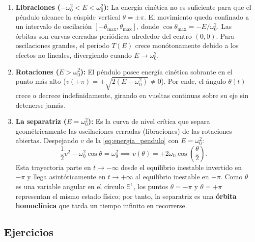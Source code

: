 \begin{enumerate}
    \item \textbf{Libraciones ($-\omega_0^2 < E < \omega_0^2$):}
    La energía cinética no es suficiente para que el péndulo alcance la cúspide vertical $\theta = \pm \pi$. El movimiento queda confinado a un intervalo de oscilación $[-\theta_{\max}, \theta_{\max}]$, donde $\cos\theta_{\max} = -E/\omega_0^2$. Las órbitas son curvas cerradas periódicas alrededor del centro $(0,0)$. Para oscilaciones grandes, el periodo $T(E)$ crece monótonamente debido a los efectos no lineales, divergiendo cuando $E \to \omega_0^2$.
    
    \item \textbf{Rotaciones ($E > \omega_0^2$):}
    El péndulo posee energía cinética sobrante en el punto más alto ($v(\pm\pi) = \pm\sqrt{2(E - \omega_0^2)} \neq 0$). Por ende, el ángulo $\theta(t)$ crece o decrece indefinidamente, girando en vueltas continuas sobre su eje sin detenerse jamás.
    
    \item \textbf{La separatriz ($E = \omega_0^2$):}
    Es la curva de nivel crítica que separa geométricamente las oscilaciones cerradas (libraciones) de las rotaciones abiertas. Despejando $v$ de la \cref{eq:energia_pendulo} con $E = \omega_0^2$:
    \begin{equation}
        \frac{1}{2}v^2 - \omega_0^2 \cos\theta = \omega_0^2 \implies v(\theta) = \pm 2\omega_0 \cos\left(\frac{\theta}{2}\right).
        \label{eq:separatriz_formula}
    \end{equation}
    Esta trayectoria parte en $t \to -\infty$ desde el equilibrio inestable invertido en $-\pi$ y llega asintóticamente en $t \to +\infty$ al equilibrio inestable en $+\pi$. Como $\theta$ es una variable angular en el círculo $\mathbb{S}^1$, los puntos $\theta = -\pi$ y $\theta = +\pi$ representan el mismo estado físico; por tanto, la separatriz es una \textbf{órbita homoclínica} que tarda un tiempo infinito en recorrerse.
\end{enumerate}

\subsection{Ejercicios}

